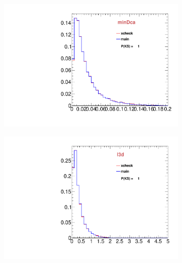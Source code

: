 \begin{figure}
\begin{subfigure}[b]{0.2\textwidth}
                \includegraphics[width=\textwidth]{Figures/VariablesComparison/MC_endcaps_figs/docatrk}
                \label{fig:MC_endcaps_docatrk}
        \end{subfigure}
        \begin{subfigure}[b]{0.2\textwidth}
                \centering
                \includegraphics[width=\textwidth]{Figures/VariablesComparison/MC_endcaps_figs/fl3d}
                \label{fig:MC_endcaps_fl3d}
        \end{subfigure}
        \begin{subfigure}[b]{0.2\textwidth}
                \centering

\end{subfigure}
\end{figure}
